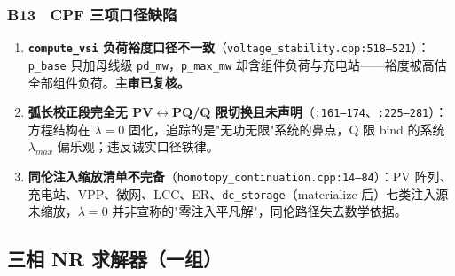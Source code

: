 \documentclass[11pt,a4paper,fontset=fandol]{ctexart}
\newcommand{\file}[1]{\texttt{#1}}
\begin{document}
\subsubsection*{B13　CPF 三项口径缺陷}
\begin{enumerate}
  \item \textbf{\file{compute\_vsi} 负荷裕度口径不一致}（\file{voltage\_stability.cpp:518--521}）：\texttt{p\_base} 只加母线级 \texttt{pd\_mw}，\texttt{p\_max\_mw} 却含组件负荷与充电站——裕度被高估全部组件负荷。\textbf{主审已复核。}
  \item \textbf{弧长校正段完全无 PV$\leftrightarrow$PQ/Q 限切换且未声明}（\file{:161--174}、\file{:225--281}）：方程结构在 $\lambda=0$ 固化，追踪的是"无功无限"系统的鼻点，Q 限 bind 的系统 $\lambda_{max}$ 偏乐观；违反诚实口径铁律。
  \item \textbf{同伦注入缩放清单不完备}（\file{homotopy\_continuation.cpp:14--84}）：PV 阵列、充电站、VPP、微网、LCC、ER、\texttt{dc\_storage}（materialize 后）七类注入源未缩放，$\lambda=0$ 并非宣称的"零注入平凡解"，同伦路径失去数学依据。
\end{enumerate}

\subsection{三相 NR 求解器（一组）}
\end{document}
